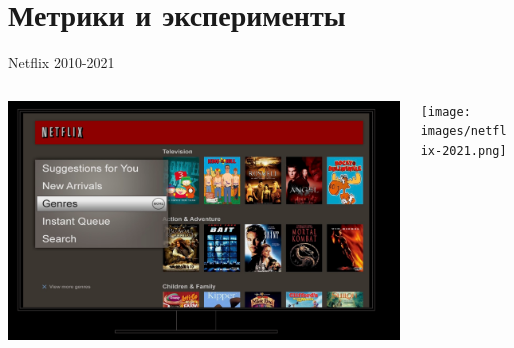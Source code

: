 \documentclass[11pt,aspectratio=169,handout]{beamer}
\begin{document}
\section{Метрики и эксперименты}

\begin{frame}{Netflix 2010-2021 \cite{NETFLIXAB}}

\begin{columns}
\begin{column}{0.45\textwidth}
   \begin{center}
		\includegraphics[scale=0.15]{images/netflix-2010.png}
   \end{center}
\end{column}
\begin{column}{0.45\textwidth}
   \begin{center}
		\texttt{[image: images/netflix-2021.png]}
   \end{center}
\end{column}
\end{columns}

\end{frame}
\end{document}
